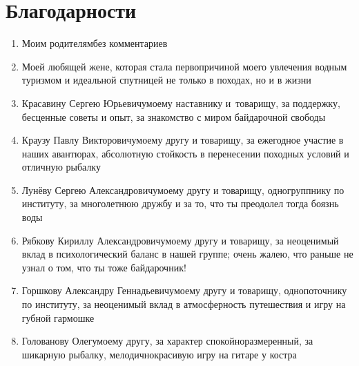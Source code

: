 \newpage
\pagestyle{empty}
\section*{Благодарности}

\begin{enumerate}
\item Моим родителям\mdash без комментариев
%
\item Моей любящей жене, которая стала первопричиной моего увлечения водным туризмом и идеальной спутницей не только в походах, но и в жизни
%
\item Красавину Сергею Юрьевичу\mdash моему наставнику и~товарищу, за поддержку, бесценные советы и опыт, за знакомство с миром байдарочной свободы
%
\item Краузу Павлу Викторовичу\mdash моему другу и товарищу, за ежегодное участие в наших авантюрах, абсолютную стойкость в перенесении походных условий и отличную рыбалку 
%
\item Лунёву Сергею Александровичу\mdash моему другу и товарищу, одногруппнику по институту, за многолетнюю дружбу и за то, что ты преодолел тогда боязнь воды
%
\item Рябкову Кириллу Александровичу\mdash моему другу и товарищу, за неоценимый вклад в психологический баланс в нашей группе; очень жалею, что раньше не узнал о том, что ты тоже байдарочник!
%
\item Горшкову Александру Геннадьевичу\mdash моему другу и товарищу, однопоточнику по институту, за неоценимый вклад в атмосферность путешествия и игру на губной гармошке
%
\item Голованову Олегу\mdash моему другу, за характер спокойно\sdash размеренный, за шикарную рыбалку, мелодично\sdash красивую игру на гитаре у костра

\end{enumerate}
